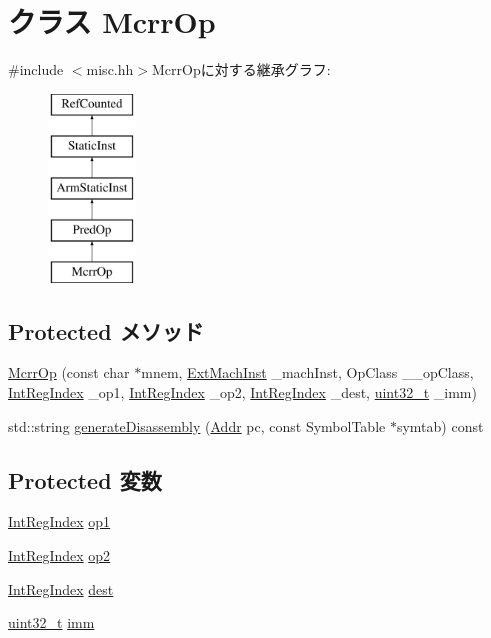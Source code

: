 \hypertarget{classMcrrOp}{
\section{クラス McrrOp}
\label{classMcrrOp}
}


{\ttfamily \#include $<$misc.hh$>$}McrrOpに対する継承グラフ:\begin{figure}[H]
\begin{center}
\leavevmode
\includegraphics[height=5cm]{classMcrrOp}
\end{center}
\end{figure}
\subsection*{Protected メソッド}
\begin{DoxyCompactItemize}
\item 
\hyperlink{classMcrrOp_aecdb116a7a7d35431cd42e4075a531ee}{McrrOp} (const char $\ast$mnem, \hyperlink{classStaticInst_a5605d4fc727eae9e595325c90c0ec108}{ExtMachInst} \_\-machInst, OpClass \_\-\_\-opClass, \hyperlink{namespaceArmISA_ae64680ba9fb526106829d6bf92fc791b}{IntRegIndex} \_\-op1, \hyperlink{namespaceArmISA_ae64680ba9fb526106829d6bf92fc791b}{IntRegIndex} \_\-op2, \hyperlink{namespaceArmISA_ae64680ba9fb526106829d6bf92fc791b}{IntRegIndex} \_\-dest, \hyperlink{Type_8hh_a435d1572bf3f880d55459d9805097f62}{uint32\_\-t} \_\-imm)
\item 
std::string \hyperlink{classMcrrOp_a95d323a22a5f07e14d6b4c9385a91896}{generateDisassembly} (\hyperlink{classm5_1_1params_1_1Addr}{Addr} pc, const SymbolTable $\ast$symtab) const 
\end{DoxyCompactItemize}
\subsection*{Protected 変数}
\begin{DoxyCompactItemize}
\item 
\hyperlink{namespaceArmISA_ae64680ba9fb526106829d6bf92fc791b}{IntRegIndex} \hyperlink{classMcrrOp_a4c465c43ad568f8bcf8ae71480e9cfea}{op1}
\item 
\hyperlink{namespaceArmISA_ae64680ba9fb526106829d6bf92fc791b}{IntRegIndex} \hyperlink{classMcrrOp_a7799ff6cbe5a252199059eb8665820e7}{op2}
\item 
\hyperlink{namespaceArmISA_ae64680ba9fb526106829d6bf92fc791b}{IntRegIndex} \hyperlink{classMcrrOp_aec72e8e45bdc87abeeeb75d2a8a9a716}{dest}
\item 
\hyperlink{Type_8hh_a435d1572bf3f880d55459d9805097f62}{uint32\_\-t} \hyperlink{classMcrrOp_a3aa9e175bd81b38df0e566643d5d4f8d}{imm}
\end{DoxyCompactItemize}


